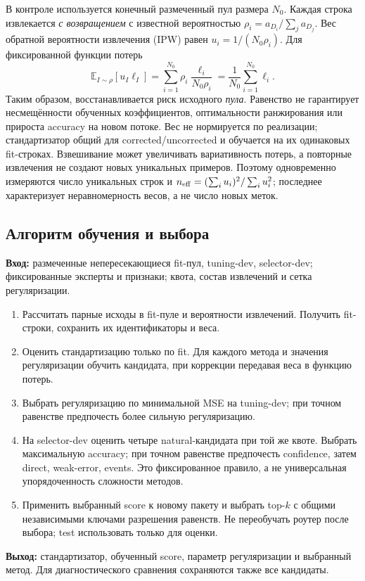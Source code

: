 В контроле используется конечный размеченный пул размера $N_0$.
Каждая строка извлекается \emph{с возвращением} с известной
вероятностью $\rho_i=a_{D_i}/\sum_j a_{D_j}$.
Вес обратной вероятности извлечения (IPW) равен
$u_i=1/(N_0\rho_i)$. Для фиксированной функции потерь
\begin{equation}\label{eq:ipw}
\mathbb E_{I\sim\rho}[u_I\ell_I]
=\sum_{i=1}^{N_0}\rho_i\frac{\ell_i}{N_0\rho_i}
=\frac{1}{N_0}\sum_{i=1}^{N_0}\ell_i.
\end{equation}
Таким образом, восстанавливается риск исходного \emph{пула}.
Равенство не гарантирует несмещённости обученных коэффициентов,
оптимальности ранжирования или прироста accuracy на новом потоке.
Вес не нормируется по реализации; стандартизатор общий для
corrected/uncorrected и обучается на их одинаковых fit-строках.
Взвешивание может увеличивать вариативность потерь, а повторные извлечения
не создают новых уникальных примеров. Поэтому одновременно измеряются
число уникальных строк и $n_{\rm eff}=(\sum_i u_i)^2/\sum_i u_i^2$;
последнее характеризует неравномерность весов, а не число новых меток.

\subsection{Алгоритм обучения и выбора}
\noindent\textbf{Вход:} размеченные непересекающиеся fit-пул,
tuning-dev, selector-dev; фиксированные эксперты и признаки;
квота, состав извлечений и сетка регуляризации.
\begin{enumerate}
\item Рассчитать парные исходы в fit-пуле и вероятности извлечений.
Получить fit-строки, сохранить их идентификаторы и веса.
\item Оценить стандартизацию только по fit. Для каждого метода
и значения регуляризации обучить кандидата, при коррекции передавая
веса в функцию потерь.
\item Выбрать регуляризацию по минимальной MSE на tuning-dev;
при точном равенстве предпочесть более сильную регуляризацию.
\item На selector-dev оценить четыре natural-кандидата при той же квоте.
Выбрать максимальную accuracy; при точном равенстве предпочесть
confidence, затем direct, weak-error, events. Это фиксированное правило,
а не универсальная упорядоченность сложности методов.
\item Применить выбранный score к новому пакету и выбрать top-$k$
с общими независимыми ключами разрешения равенств. Не переобучать
роутер после выбора; test использовать только для оценки.
\end{enumerate}
\noindent\textbf{Выход:} стандартизатор, обученный score, параметр
регуляризации и выбранный метод. Для диагностического сравнения
сохраняются также все кандидаты.

